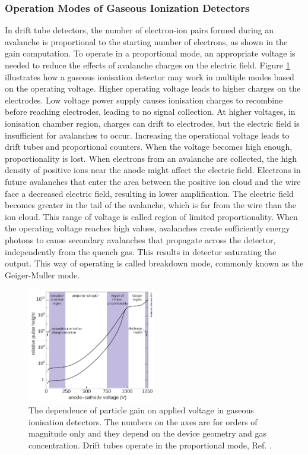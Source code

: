 \subsubsection{Operation Modes of Gaseous Ionization Detectors}
In drift tube detectors, the number of electron-ion pairs formed during an avalanche is 
proportional to the starting number of electrons, as shown in the gain computation. To 
operate in a proportional mode, an appropriate voltage is needed to reduce the effects 
of avalanche charges on the electric field. Figure \ref{fig:gaseous} illustrates how a 
gaseous ionisation detector may work in multiple modes based on the operating voltage. Higher operating 
voltage leads to higher charges on the electrodes. Low voltage power supply causes ionisation charges to recombine 
before reaching electrodes, leading to no signal collection. At higher voltages, in ionisation chamber 
region, charges can drift to electrodes, but the electric field is insufficient for avalanches to occur. 
Increasing the operational voltage leads to drift tubes and proportional counters. When the voltage 
becomes high enough, proportionality is lost. When electrons from an avalanche are collected, 
the high density of positive ions near the anode might affect the electric field. 
Electrons in future avalanches that enter the area between the positive ion cloud and the wire face a 
decreased electric field, resulting in lower amplification. The electric field becomes greater in the 
tail of the avalanche, which is far from the wire than the ion cloud. This range of voltage is called region of 
limited proportionality. When the operating voltage reaches high values, 
avalanches create sufficiently energy photons to cause secondary avalanches 
that propagate across the detector, independently from the quench gas. 
This results in detector saturating the output. This way of operating is 
called breakdown mode, commonly known as the Geiger-Muller mode.
\begin{figure}[!h]
    \centering
    \includegraphics[width =0.5\textwidth]{figures/png/Screenshot_20240330_203416.png}
    \caption[The dependence of particle gain on applied voltage in gaseous ionisation detectors.]{The dependence of particle gain on applied voltage in gaseous ionisation detectors. 
    The numbers on the axes are for orders of magnitude only and they depend on the device geometry and gas concentration. 
    Drift tubes operate in the proportional mode, Ref. \cite{kola}.}
    \label{fig:gaseous}
    \end{figure}
